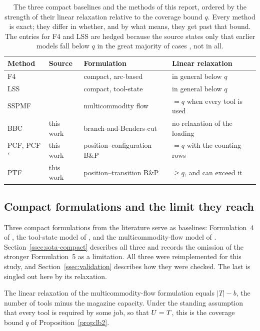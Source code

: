 \begin{table}[t]\centering
\footnotesize
\begin{tabular}{@{}llll@{}}
\toprule
Method & Source & Formulation & Linear relaxation \\
\midrule
F4          & \citet{Catanzaro2015} & compact, arc-based            & in general below $q$ \\
LSS         & \citet{Laporte2004}   & compact, tool-state           & in general below $q$ \\
SSPMF       & \citet{daSilva2024}   & multicommodity flow           & $=q$ when every tool is used \\
BBC         & this work             & branch-and-Benders-cut        & no relaxation of the loading \\
PCF, PCF$'$ & this work             & position--configuration B\&P  & $=q$ with the counting rows \\
PTF         & this work             & position--transition B\&P     & $\ge q$, and can exceed it \\
\bottomrule
\end{tabular}
\caption{The three compact baselines and the methods of this report, ordered by the
strength of their linear relaxation relative to the coverage bound $q$. Every method
is exact; they differ in whether, and by what means, they get past that bound. The
entries for F4 and LSS are hedged because the source states only that earlier models
fall below $q$ in the great majority of cases \citep{daSilva2024}, not in all.}
\label{tab:methods}
\end{table}

\subsection{Compact formulations and the limit they reach}\label{ssec:compact}

Three compact formulations from the literature serve as baselines: Formulation~4 of
\citet{Catanzaro2015}, the tool-state model of \citet{Laporte2004}, and the
multicommodity-flow model of \citet{daSilva2024}. Section~\ref{ssec:sota-compact}
describes all three and records the omission of the stronger Formulation~5 as a
limitation. All three were reimplemented for this study, and
Section~\ref{ssec:validation} describes how they were checked. The last is singled out
here by its relaxation.

\begin{proposition}\label{prop:sspmf-lp}
The linear relaxation of the multicommodity-flow formulation equals
$\lvert T\rvert-b$, the number of tools minus the magazine capacity. Under the
standing assumption that every tool is required by some job, so that $U=T$, this is
the coverage bound $q$ of Proposition~\ref{prop:lb2}.
\end{proposition}

